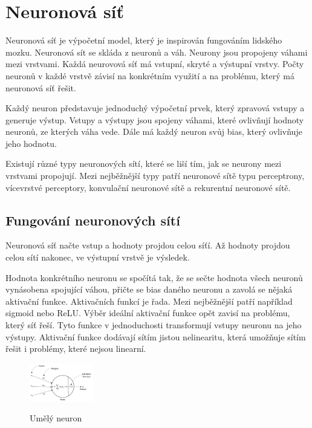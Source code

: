\section{Neuronová síť}
Neuronová síť je výpočetní model, který je inspirován fungováním lidského mozku.
Neuronová sít se skláda z neuronů a váh.
Neurony jsou propojeny váhami mezi vrstvami.
Každá neurovová síť má vstupní, skryté a výstupní vrstvy.
Počty neuronů v každé vrstvě závisí na konkrétním využití a na problému, který má neuronová síť řešit.

Každý neuron představuje jednoduchý výpočetní prvek, který zpravová vstupy a generuje výstup.
Vstupy a výstupy jsou spojeny váhami, které ovlivňují hodnoty neuronů, ze kterých váha vede.
Dále má každý neuron svůj bias, který ovlivňuje jeho hodnotu.

Existují různé typy neuronových sítí, které se liší tím, jak se neurony mezi vrstvami propojují.
Mezi nejběžnější typy patří neuronové sítě typu perceptrony, vícevrstvé perceptory, konvulační neuronové sítě a rekurentní neuronové sítě.

\subsection{Fungování neuronových sítí}
Neuronová síť načte vstup a hodnoty projdou celou síťí.
Až hodnoty projdou celou sítí nakonec, ve výstupní vrstvě je výsledek.

Hodnota konkrétního neuronu se spočítá tak, že se sečte hodnota všech neuronů vynásobena spojující váhou, přičte se bias daného neuronu a zavolá se nějaká aktivační funkce.
Aktivačních funkcí je řada. Mezi nejběžnější patří například sigmoid nebo ReLU. Výběr ideální aktivační funkce opět zavisí na problému, který síť řeší.
Tyto funkce v jednoduchosti transformují vstupy neuronu na jeho výstupy.
Aktivační funkce dodávají sítím jistou nelinearitu, která umožňuje sítím řešit i problémy, které nejsou linearní.

\begin{figure}[h]
    \centering
    \includegraphics[width=0.25\textwidth]{images/neuron.jpg}
    \caption{Umělý neuron}
    \cite{umely_neuron}
\end{figure}


